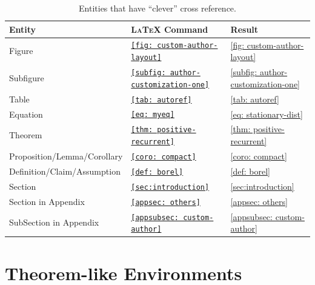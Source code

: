 \documentclass[11pt]{../arxiv}
\begin{document}
    \begin{table}[!htbp]
    \begin{center}\caption{Entities that have ``clever'' cross reference.}\label{tab: autoref}
    \begin{tabular}{@{}lll@{}}
    \toprule
    Entity & \textsc{LaTeX} Command & Result \\ \midrule
    Figure & \texttt{\autoref{fig: custom-author-layout}} & \autoref{fig: custom-author-layout}\\ 
    Subfigure & \texttt{\autoref{subfig: author-customization-one}} & \autoref{subfig: author-customization-one}\\
    Table & \texttt{\autoref{tab: autoref}} & \autoref{tab: autoref}\\
    Equation & \texttt{\autoref{eq: myeq}} & \autoref{eq: stationary-dist}\\
    Theorem & \texttt{\autoref{thm: positive-recurrent}} & \autoref{thm: positive-recurrent}\\
    Proposition/Lemma/Corollary & \texttt{\autoref{coro: compact}} & \autoref{coro: compact}\\
    Definition/Claim/Assumption & \texttt{\autoref{def: borel}} & \autoref{def: borel}\\
    Section & \texttt{\autoref{sec:introduction}} & \autoref{sec:introduction}\\
    Section in Appendix & \texttt{\autoref{appsec: others}} & \autoref{appsec: others}\\
    SubSection in Appendix & \texttt{\autoref{appsubsec: custom-author}} & \autoref{appsubsec: custom-author}\\
    \bottomrule
    \end{tabular}
    \end{center}
    \end{table}

\section{Theorem-like Environments}\label{sec: theorem-environment}
\end{document}
